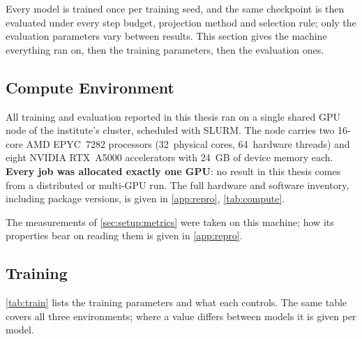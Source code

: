 Every model is trained once per training seed, and the same checkpoint is then evaluated under every step
budget, projection method and selection rule; only the evaluation parameters vary between results. This
section gives the machine everything ran on, then the training parameters, then the evaluation ones.

\subsection{Compute Environment}\label{sec:setup:protocol:compute}

All training and evaluation reported in this thesis ran on a single shared GPU node of the
institute's cluster, scheduled with SLURM. The node carries two 16-core AMD EPYC~7282 processors
(32~physical cores, 64~hardware threads) and eight NVIDIA RTX~A5000 accelerators with 24~GB of
device memory each. \textbf{Every job was allocated exactly one GPU}: no result in this thesis comes
from a distributed or multi-GPU run. The full hardware and software inventory, including package
versions, is given in \autoref{app:repro}, \autoref{tab:compute}.

The measurements of \autoref{sec:setup:metrics} were taken on this machine; how its properties bear
on reading them is given in \autoref{app:repro}.

\subsection{Training}\label{sec:setup:protocol:training}

\autoref{tab:train} lists the training parameters and what each controls. The same table covers all three
environments; where a value differs between models it is given per model.

